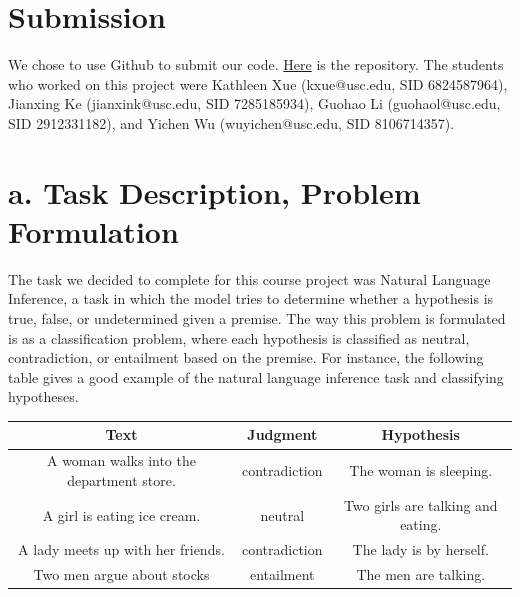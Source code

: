 \documentclass[12pt,letterpaper]{article}
\begin{document}
\section*{Submission} We chose to use Github to submit our code. \href{https://github.com/kathleen-xue/csci544project}{Here} is the repository. The students who worked on this project were Kathleen Xue (kxue@usc.edu, SID 6824587964), Jianxing Ke (jianxink@usc.edu, SID 7285185934), Guohao Li (guohaol@usc.edu, SID 2912331182), and Yichen Wu (wuyichen@usc.edu, SID 8106714357). 
\section*{a. Task Description, Problem Formulation}
The task we decided to complete for this course project was Natural Language Inference, a task in which the model tries to determine whether a hypothesis is true, false, or undetermined given a premise. The way this problem is formulated is as a classification problem, where each hypothesis is classified as neutral, contradiction, or entailment based on the premise. For instance, the following table gives a good example of the natural language inference task and classifying hypotheses.
\begin{center}
    \begin{tabular}{| c | c | c |}
        \hline
        \textbf{Text} & \textbf{Judgment} & \textbf{Hypothesis} \\ \hline
        A woman walks into the department store. & contradiction & The woman is sleeping.
        \\ \hline
        A girl is eating ice cream. & neutral & Two girls are talking and eating. \\ \hline
        A lady meets up with her friends. & contradiction & The lady is by herself. \\ \hline
        Two men argue about stocks & entailment & The men are talking. \\ \hline
    \end{tabular}
\end{center}
\end{document}
